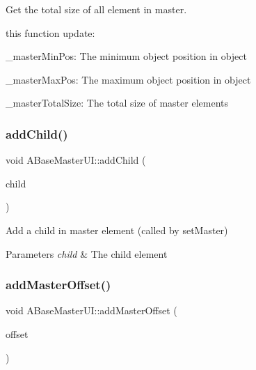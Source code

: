Get the total size of all element in master. 

this function update\+:
\begin{DoxyItemize}
\item \+\_\+master\+Min\+Pos\+: The minimum object position in object
\item \+\_\+master\+Max\+Pos\+: The maximum object position in object
\item \+\_\+master\+Total\+Size\+: The total size of master elements 
\end{DoxyItemize}\mbox{\label{class_a_base_master_u_i_ae6bcaed259182e299cdfc6fabc8e01f1}} 
\subsubsection{\texorpdfstring{add\+Child()}{addChild()}}
{\footnotesize\ttfamily void A\+Base\+Master\+U\+I\+::add\+Child (\begin{DoxyParamCaption}\item[{\hyperlink{class_a_base_u_i}{A\+Base\+UI} $\ast$}]{child }\end{DoxyParamCaption})}



Add a child in master element (called by set\+Master) 


\begin{DoxyParams}{Parameters}
{\em child} & The child element \\
\hline
\end{DoxyParams}
\mbox{\label{class_a_base_master_u_i_a384c412cf0c2fc3265d9dc6bcb7ff57e}} 
\subsubsection{\texorpdfstring{add\+Master\+Offset()}{addMasterOffset()}}
{\footnotesize\ttfamily void A\+Base\+Master\+U\+I\+::add\+Master\+Offset (\begin{DoxyParamCaption}\item[{glm\+::vec2}]{offset }\end{DoxyParamCaption})}



